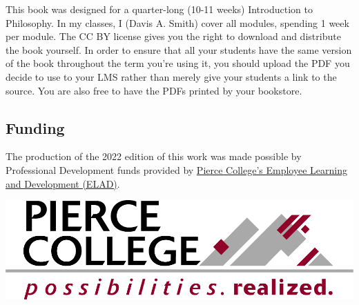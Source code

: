 This book was designed for a quarter-long (10-11 weeks) Introduction to Philosophy. In my classes, I (Davis A. Smith) cover all modules, spending 1 week per module. The CC BY license gives you the right to download and distribute the book yourself. In order to ensure that all your students have the same version of the book throughout the term you’re using it, you should upload the PDF you decide to use to your LMS rather than merely give your students a link to the source. You are also free to have the PDFs printed by your bookstore.

\subsection{Funding}

The production of the 2022 edition of this work was made possible by Professional Development funds provided by \href{https://www.pierce.ctc.edu/elad}{Pierce College's Employee Learning and Development (ELAD)}. 


\includegraphics{marcom-PierceCollege-Logo.png}


\bigskip
